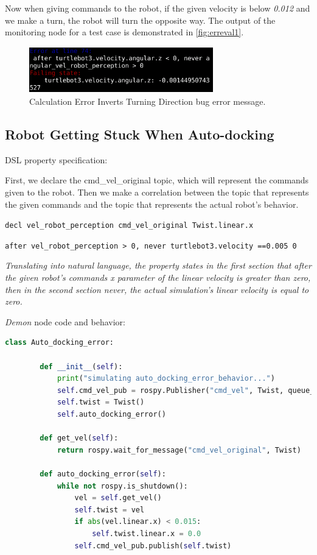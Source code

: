 Now when giving commands to the robot, if the given velocity is below \textit{0.012} and we make a turn, the robot will turn the opposite way. The output of the monitoring node for a test case is demonstrated in \autoref{fig:erreval1}.

\begin{figure}
\begin{center}
\includegraphics[width=8cm,height=2cm,keepaspectratio,]{images/erreval1.png}
\caption{Calculation Error Inverts Turning Direction bug error message.} \label{fig:erreval1}
\end{center}
\end{figure}


\subsection{Robot Getting Stuck When Auto-docking}
\label{ssec:robotgettingstuckwhenautodocking}

DSL property specification:

First, we declare the cmd\_vel\_original topic, which will represent the commands given to the robot.
Then we make a correlation between the topic that represents the given commands and the topic that represents the actual robot's behavior.

\texttt{decl vel\_robot\_perception cmd\_vel\_original Twist.linear.x}

\texttt{after vel\_robot\_perception > 0, never turtlebot3.velocity =={0.005} 0}

\textit{Translating into natural language, the property states in the first section that after the given robot's commands x parameter of the linear velocity is greater than zero, then in the second section never, the actual simulation's linear velocity is equal to zero.}

\textit{Demon} node code and behavior:

\begin{lstlisting}[language=python]
    class Auto_docking_error:

        def __init__(self):
            print("simulating auto_docking_error_behavior...")
            self.cmd_vel_pub = rospy.Publisher("cmd_vel", Twist, queue_size=1)
            self.twist = Twist()
            self.auto_docking_error()

        def get_vel(self):
            return rospy.wait_for_message("cmd_vel_original", Twist)

        def auto_docking_error(self):
            while not rospy.is_shutdown():
                vel = self.get_vel()
                self.twist = vel
                if abs(vel.linear.x) < 0.015:
                    self.twist.linear.x = 0.0
                self.cmd_vel_pub.publish(self.twist)
\end{lstlisting}

